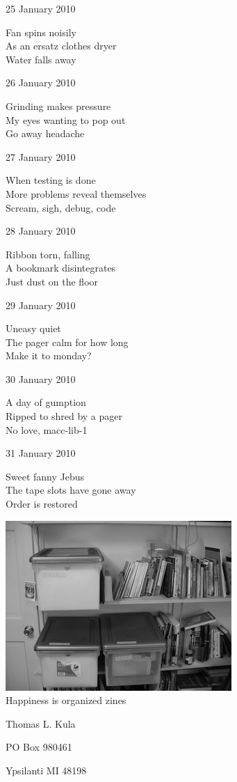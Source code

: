 \documentclass[12pt]{article}
\begin{document}
\newpage

25 January 2010

Fan spins noisily \\
As an ersatz clothes dryer \\
Water falls away

26 January 2010

Grinding makes pressure \\
My eyes wanting to pop out \\
Go away headache

27 January 2010

When testing is done \\
More problems reveal themselves \\
Scream, sigh, debug, code

28 January 2010

Ribbon torn, falling \\
A bookmark disintegrates \\
Just dust on the floor

29 January 2010

Uneasy quiet \\
The pager calm for how long \\
Make it to monday?

30 January 2010

A day of gumption \\
Ripped to shred by a pager \\
No love, macc-lib-1

31 January 2010

Sweet fanny Jebus \\
The tape slots have gone away \\
Order is restored


\newpage

\begin{center}
\includegraphics{happy-zines.jpg} \\[1cm]
Happiness is organized zines
\end{center}

\newpage

\thispagestyle{empty}
\vspace*{14cm}
\begin{sideways}
\Large{Thomas L. Kula}
\end{sideways}
\begin{sideways}
\Large{PO Box 980461}
\end{sideways}
\begin{sideways}
\Large{Ypsilanti MI 48198}
\end{sideways}
\end{document}
